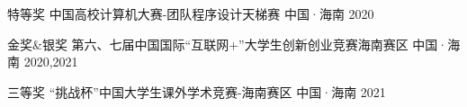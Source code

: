 

\begin{cvhonors}
	
	\cvhonor
	{特等奖} %
	{中国高校计算机大赛-团队程序设计天梯赛} %
	{中国·海南} %
	{2020} %
	
		
	\cvhonor
	{金奖\&银奖} %
	{第六、七届中国国际“互联网+”大学生创新创业竞赛海南赛区} %
	{中国·海南} %
	{2020,2021} %
	
	
	
	\cvhonor
	{三等奖} %
	{“挑战杯”中国大学生课外学术竞赛-海南赛区} %
	{中国·海南} %
	{2021} %
	
\end{cvhonors}
